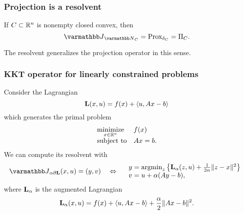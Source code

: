 \documentclass[10pt,mathserif]{beamer}
\begin{document}
\begin{frame}
\frametitle{Projection is a resolvent}
If $C\subset\mathbb{R}^n$ is nonempty closed convex, then
\[
\opJ_{\opN_C}=\prox_{\delta_C}=\proj_C.
\]

\vspace{0.2in}
The resolvent generalizes the projection operator in this sense.

\end{frame}

\begin{frame}[label=kkt_resolvent]
\frametitle{KKT operator for linearly constrained problems}
Consider the Lagrangian
\[
\mathbf{L}(x,u)=f(x)+\langle u,Ax-b\rangle
\]
which generates the primal problem
\[
\begin{array}{ll}
\underset{x\in \mathbb{R}^n}{\mbox{minimize}} &f(x)\\
\mbox{subject to} &Ax=b.
\end{array}
\]
We can compute its resolvent with
\begin{align*}
\opJ_{\alpha \partial \lagrange}(x,u )=(y,v)
\quad\Leftrightarrow\quad
\begin{array}{l}
y = \argmin_z \left\{ \lagrange_\alpha (z,u)+ \frac{1}{2\alpha}\|z-x\|^2 \right\}\\
v = u + \alpha(Ay-b),
\end{array}
\end{align*}
where $\mathbf{L}_\alpha$ is the augmented Lagrangian
\[
\mathbf{L}_\alpha(x,u)=f(x)+\langle u,Ax-b\rangle+\frac{\alpha}{2}\|Ax-b\|^2.
\]

\end{frame}
\end{document}
